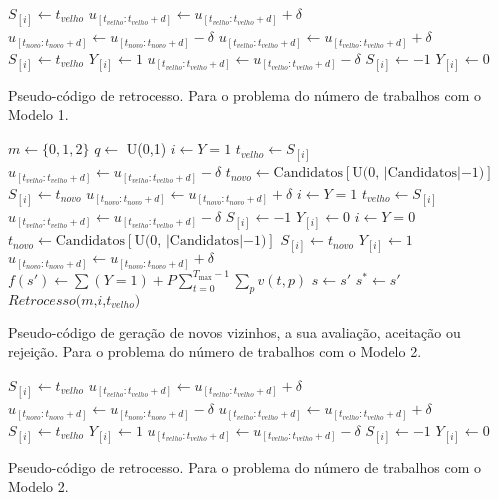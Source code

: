 \begin{algorithm}[H]
\label{algo:P2M1_main_algo_rollback}
	{
		$S_{[i]} \gets t_{velho}$\;
		$u_{[t_{velho}: t_{velho}+d]} \gets u_{[t_{velho}: t_{velho}+d]} + \delta$\;
		$u_{[t_{novo}: t_{novo}+d]} \gets u_{[t_{novo}: t_{novo}+d]} - \delta$\;
	}
	{
		$u_{[t_{velho}: t_{velho}+d]} \gets u_{[t_{velho}: t_{velho}+d]} + \delta$\;
		$S_{[i]} \gets t_{velho}$\;
		$Y_{[i]} \gets 1$\;
	}
	{
		$u_{[t_{velho}: t_{velho}+d]} \gets u_{[t_{velho}: t_{velho}+d]} - \delta$\;
		$S_{[i]} \gets -1$\;
		$Y_{[i]} \gets 0$\;
	}
    \caption{Pseudo-código de retrocesso. Para o problema do número de trabalhos com o Modelo 1.}
\end{algorithm}

\begin{algorithm}[H]
\label{algo:P2M1_GV_main_algo}
	$m \gets \{0,1,2\}$\;
	$q \gets$ U(0,1)\;
	{
		$i \gets Y=1$\;
		$t_{velho} \gets S_{[i]}$\;
    	$u_{[t_{velho}: t_{velho}+d]} \gets u_{[t_{velho}: t_{velho}+d]} - \delta$\;
    	$t_{novo} \gets \text{Candidatos}[\text{U(0, |Candidatos}|-1)]$\;
    	$S_{[i]} \gets t_{novo}$\;
    	$u_{[t_{novo}: t_{novo}+d]} \gets u_{[t_{novo}: t_{novo}+d]} + \delta$\;
	}
	{
		$i \gets Y=1$\;
		$t_{velho} \gets S_{[i]}$\;
		$u_{[t_{velho}: t_{velho}+d]} \gets u_{[t_{velho}: t_{velho}+d]} - \delta$\;
		$S_{[i]} \gets -1$\;
		$Y_{[i]} \gets 0$\;
	}
	{
		$i \gets Y=0$\;
		$t_{novo} \gets \text{Candidatos}[\text{U(0, |Candidatos}|-1)]$\;
		$S_{[i]} \gets t_{novo}$\;
		$Y_{[i]} \gets 1$\;
		$u_{[t_{novo}: t_{novo}+d]} \gets u_{[t_{novo}: t_{novo}+d]} + \delta$\;
	}
    $f(s') \gets \sum (Y=1) + P \sum_{t=0}^{T_{\max}-1}\sum_{p}v(t,p)$\;
	{
		$s \gets s'$\;
		{
			$s^* \gets s'$
		}
	}
	\Else
	{
		$\textit{Retrocesso(m,i,}t_{velho})$\;
	}
    \caption{Pseudo-código de geração de novos vizinhos, a sua avaliação, aceitação ou rejeição. Para o problema do número de trabalhos com o Modelo 2.}
\end{algorithm}

\begin{algorithm}[H]
\label{algo:P2M1_GV_main_algo_rollback}
	{
		$S_{[i]} \gets t_{velho}$\;
		$u_{[t_{velho}: t_{velho}+d]} \gets u_{[t_{velho}: t_{velho}+d]} + \delta$\;
		$u_{[t_{novo}: t_{novo}+d]} \gets u_{[t_{novo}: t_{novo}+d]} - \delta$\;
	}
	{
		$u_{[t_{velho}: t_{velho}+d]} \gets u_{[t_{velho}: t_{velho}+d]} + \delta$\;
		$S_{[i]} \gets t_{velho}$\;
		$Y_{[i]} \gets 1$\;
	}
	{
		$u_{[t_{velho}: t_{velho}+d]} \gets u_{[t_{velho}: t_{velho}+d]} - \delta$\;
		$S_{[i]} \gets -1$\;
		$Y_{[i]} \gets 0$\;
	}
    \caption{Pseudo-código de retrocesso. Para o problema do número de trabalhos com o Modelo 2.}
\end{algorithm}

